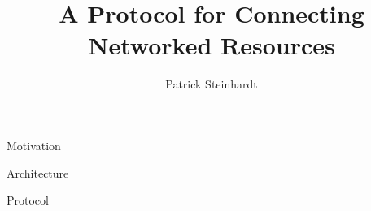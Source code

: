\documentclass[a4paper]{beamer}
\author{Patrick Steinhardt}
\title{A Protocol for Connecting Networked Resources}
\institute{Freie Universität Berlin}
\begin{document}
\begin{frame}[plain]
    \maketitle
\end{frame}

\begin{frame}{Motivation}
\end{frame}

\begin{frame}{Architecture}
\end{frame}

\begin{frame}{Protocol}
\end{frame}
\end{document}
